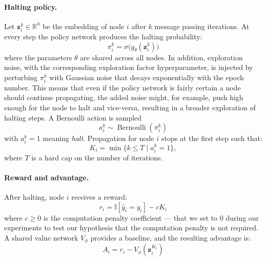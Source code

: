 \documentclass{gdl}
\begin{document}
\paragraph{Halting policy.}
Let $\mathbf{z}_i^{k}\in\mathbb{R}^h$ be the embedding of node $i$ after $k$ message passing iterations. At every step the policy network produces the halting probability:
\begin{equation}
\pi_i^{k}=\sigma\bigl(g_{\theta}(\mathbf{z}_i^{k})\bigr)
\end{equation}
where the parameters $\theta$ are shared across all nodes. In addition, exploration noise, with the corresponding exploration factor hyperparameter, is injected by perturbing $\pi_i^{k}$ with Gaussian noise that decays exponentially with the epoch number. This means that even if the policy network is fairly certain a node should continue propagating, the added noise might, for example, push high enough for the node to halt and vice-versa, resulting in a broader exploration of halting steps. A Bernoulli action is sampled
\begin{equation}
a_i^{k} \sim \operatorname{Bernoulli}(\pi_i^{k})
\end{equation}
with $a_i^{k}=1$ meaning \emph{halt}. Propagation for node $i$ stops at the first step such that:
\begin{equation}
K_i = \min\{ k \le T \mid a_i^k = 1 \},
\end{equation}
where $T$ is a hard cap on the number of iterations.

\paragraph{Reward and advantage.}
After halting, node $i$ receives a reward:
\begin{equation}
r_i = \mathbb{I}[\hat{y}_i = y_i] - cK_i
\end{equation}
where $c\ge 0$ is the computation penalty coefficient --- that we set to 0 during our experiments to test our hypothesis that the computation penalty is not required. A shared value network $V_{\phi}$ provides a baseline, and the resulting advantage is:
\begin{equation}
A_i = r_i - V_{\phi}(\mathbf{z}_i^{K_i})
\end{equation}
\end{document}
